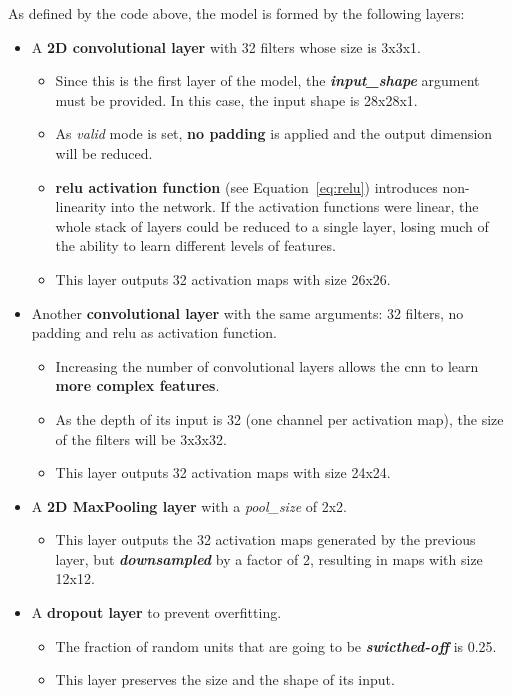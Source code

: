 As defined by the code above, the model is formed by the following layers:
\begin{itemize}
	\item A \textbf{2D convolutional layer} with 32 filters whose size is 3x3x1.
	\begin{itemize}
		\item Since this is the first layer of the model, the \textbf{\textit{input\_shape}} argument must be provided. In this case, the input shape is 28x28x1. 
		\item As \textit{valid} mode is set, \textbf{no padding} is applied and the output dimension will be reduced. 
		\item \textbf{\gls{relu} activation function} (see Equation~\ref{eq:relu}) introduces non-linearity into the network. If the activation functions were linear, the whole stack of layers could be reduced to a single layer, losing much of the ability to learn different levels of features.
		\item This layer outputs 32 activation maps with size 26x26.
	\end{itemize}
	
	\item Another \textbf{convolutional layer} with the same arguments: 32 filters, no padding and \gls{relu} as activation function.
	\begin{itemize}
		\item Increasing the number of convolutional layers allows the \gls{cnn} to learn \textbf{more complex features}. 
		\item As the depth of its input is 32 (one channel per activation map), the size of the filters will be 3x3x32. 
		\item This layer outputs 32 activation maps with size 24x24.
	\end{itemize}
	
	\item A \textbf{2D MaxPooling layer} with a \textit{pool\_size} of 2x2.
	\begin{itemize}
		\item This layer outputs the 32 activation maps generated by the previous layer, but \textbf{\textit{downsampled}} by a factor of 2, resulting in maps with size 12x12.
	\end{itemize}
	
	\item A \textbf{dropout layer} to prevent overfitting. 
	\begin{itemize}
		\item The fraction of random units that are going to be \textbf{\textit{swicthed-off}} is 0.25.
		\item This layer preserves the size and the shape of its input.
	\end{itemize} 
	

\end{itemize}
